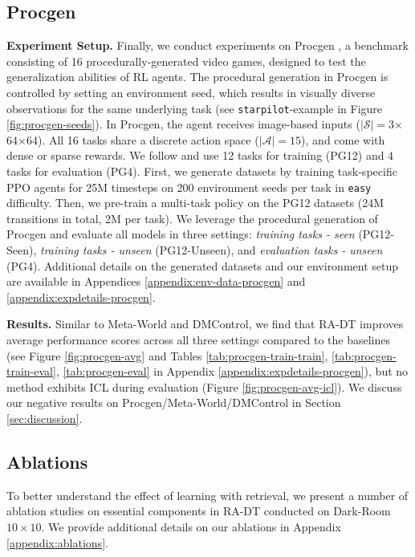 \documentclass{article} %
\begin{document}
\subsection{Procgen}\label{sec:exp-procgen}

\textbf{Experiment Setup.}
Finally, we conduct experiments on Procgen \citep{Cobbe:20}, a benchmark consisting 
of 16 procedurally-generated video games, designed to test the generalization abilities of RL agents.
The procedural generation in Procgen is controlled by setting an environment seed, which results in visually diverse observations for the same underlying task (see \texttt{starpilot}-example in Figure \ref{fig:procgen-seeds}). 
In Procgen, the agent receives image-based inputs ($|\mathcal{S}|=$3$\times$64$\times$64).
All 16 tasks share a discrete action space ($|\mathcal{A}|=15$), and come with dense or sparse rewards.
We follow \citet{Raparthy:23} and use 12 tasks for training (PG12) and 4 tasks for evaluation (PG4). %
First, we generate datasets by training task-specific PPO agents for 25M timesteps on 200 environment seeds per task in \texttt{easy} difficulty.
Then, we pre-train a multi-task policy on the PG12 datasets (24M transitions in total, 2M per task).
We leverage the procedural generation of Procgen and evaluate all models in three settings: \emph{training tasks - seen} (PG12-Seen), \emph{training tasks - unseen} (PG12-Unseen), and \emph{evaluation tasks - unseen} (PG4).
Additional details on the generated datasets and our environment setup are available in Appendices \ref{appendix:env-data-procgen} and \ref{appendix:expdetails-procgen}.

\textbf{Results.}
Similar to Meta-World and DMControl, we find that RA-DT improves average performance scores across all three settings compared to the baselines (see Figure \ref{fig:procgen-avg} and Tables \ref{tab:procgen-train-train}, \ref{tab:procgen-train-eval}, \ref{tab:procgen-eval} in Appendix \ref{appendix:expdetails-procgen}), but no method exhibits ICL during evaluation (Figure \ref{fig:procgen-avg-icl}). 
We discuss our negative results on Procgen/Meta-World/DMControl in Section \ref{sec:discussion}.

\subsection{Ablations}\label{sec:exp-ablations}
To better understand the effect of learning with retrieval, we present a number of ablation studies on essential components in RA-DT conducted on Dark-Room $10\times 10$. We provide additional details on our ablations in Appendix \ref{appendix:ablations}.
\end{document}
